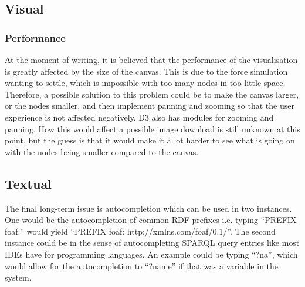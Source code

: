 \subsection{Visual}
\subsubsection{Performance}
At the moment of writing, it is believed that the performance of the visualisation is greatly affected by the size of the canvas. This is due to the force simulation wanting to settle, which is impossible with too many nodes in too little space. Therefore, a possible solution to this problem could be to make the canvas larger, or the nodes smaller, and then implement panning and zooming so that the user experience is not affected negatively. D3 also has modules for zooming and panning\cite{d3zoom}. How this would affect a possible image download is still unknown at this point, but the guess is that it would make it a lot harder to see what is going on with the nodes being smaller compared to the canvas.
\subsection{Textual}
The final long-term issue is autocompletion which can be used in two instances. One would be the autocompletion of common RDF prefixes i.e. typing “PREFIX foaf:” would yield “PREFIX foaf: http://xmlns.com/foaf/0.1/”. The second instance could be in the sense of autocompleting SPARQL query entries like most IDEs have for programming languages. An example could be typing “?na”, which would allow for the autocompletion to “?name” if that was a variable in the system. 